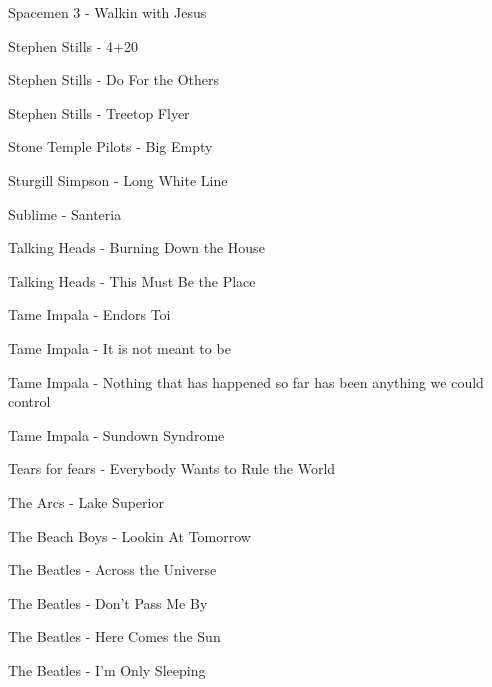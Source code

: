 Spacemen 3 - Walkin with Jesus \dotfill \pageref{Walkin with Jesus - Spacemen 3} 

Stephen Stills - 4+20 \dotfill \pageref{4+20 - Stephen Stills} 

Stephen Stills - Do For the Others \dotfill \pageref{Do For the Others - Stephen Stills} 

Stephen Stills - Treetop Flyer \dotfill \pageref{Treetop Flyer - Stephen Stills} 

Stone Temple Pilots - Big Empty \dotfill \pageref{Big Empty - Stone Temple Pilots} 

Sturgill Simpson - Long White Line \dotfill \pageref{Long White Line - Sturgill Simpson} 

Sublime - Santeria \dotfill \pageref{Santeria - Sublime} 

Talking Heads - Burning Down the House \dotfill \pageref{Burning Down the House - Talking Heads} 

Talking Heads - This Must Be the Place \dotfill \pageref{This Must Be the Place - Talking Heads} 

Tame Impala - Endors Toi \dotfill \pageref{Endors Toi - Tame Impala} 

Tame Impala - It is not meant to be \dotfill \pageref{It is not meant to be - Tame Impala} 

Tame Impala - Nothing that has happened so far has been anything we could control \dotfill \pageref{Nothing that has happened so far has been anything we could control - Tame Impala} 

Tame Impala - Sundown Syndrome \dotfill \pageref{Sundown Syndrome - Tame Impala} 

Tears for fears - Everybody Wants to Rule the World \dotfill \pageref{Everybody Wants to Rule the World - Tears for fears} 

The Arcs - Lake Superior \dotfill \pageref{Lake Superior - The Arcs} 

The Beach Boys - Lookin At Tomorrow \dotfill \pageref{Lookin At Tomorrow - The Beach Boys} 

The Beatles - Across the Universe \dotfill \pageref{Across the Universe - The Beatles} 

The Beatles - Don't Pass Me By \dotfill \pageref{Don't Pass Me By - The Beatles} 

The Beatles - Here Comes the Sun \dotfill \pageref{Here Comes the Sun - The Beatles} 

The Beatles - I'm Only Sleeping \dotfill \pageref{I'm Only Sleeping - The Beatles} 


